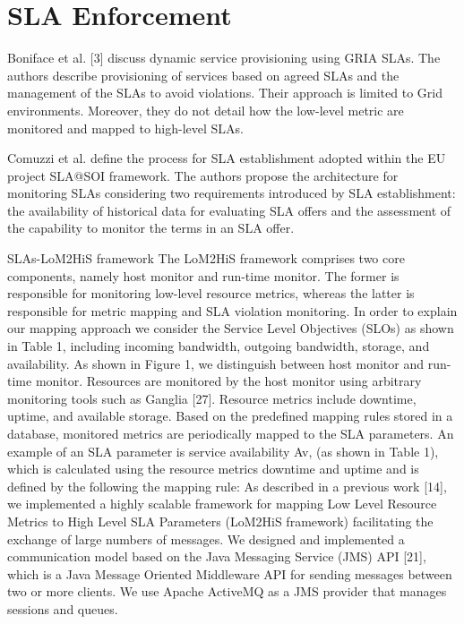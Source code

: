 \section{SLA Enforcement}




Boniface et al. [3] discuss dynamic service provisioning using GRIA SLAs. The authors describe provisioning of services based on agreed SLAs and the management of the SLAs to avoid violations. Their approach is limited to Grid environments. Moreover, they do not detail how the low-level metric are monitored and mapped to high-level SLAs. 

Comuzzi et al. \cite{5175897} define the process for SLA establishment adopted within the EU project SLA@SOI framework. The authors propose the architecture for monitoring SLAs considering two requirements introduced by SLA establishment: the availability of historical data for evaluating SLA offers and the assessment of the capability to monitor the terms in an SLA offer.


SLAs-LoM2HiS framework
The LoM2HiS framework comprises two core components, namely host monitor and run-time monitor. The former is responsible for monitoring low-level resource metrics, whereas the latter is responsible for metric mapping and SLA
violation monitoring. In order to explain our mapping approach we consider
the Service Level Objectives (SLOs) as shown in Table 1, including incoming
bandwidth, outgoing bandwidth, storage, and availability.
As shown in Figure 1, we distinguish between host monitor and run-time
monitor. Resources are monitored by the host monitor using arbitrary monitoring tools such as Ganglia [27]. Resource metrics include downtime, uptime, and
available storage. Based on the predefined mapping rules stored in a database,
monitored metrics are periodically mapped to the SLA parameters. An example
of an SLA parameter is service availability Av, (as shown in Table 1), which is
calculated using the resource metrics downtime and uptime and is defined by
the following the mapping rule: As described in a previous work [14], we implemented a highly scalable framework for mapping Low Level Resource Metrics to High Level SLA Parameters
(LoM2HiS framework) facilitating the exchange of large numbers of messages.
We designed and implemented a communication model based on the Java Messaging Service (JMS) API [21], which is a Java Message Oriented Middleware
API for sending messages between two or more clients. We use Apache ActiveMQ
as a JMS provider that manages sessions and queues.


